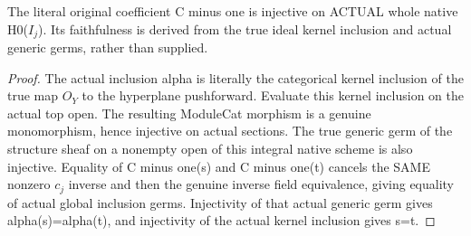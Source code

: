 \begin{lemma}
\label{lem:seven-native-negative-global-coefficient-faithful}
\leanok
The literal original coefficient C minus one is injective on ACTUAL
whole native H0($I_j$). Its faithfulness is derived from the true ideal
kernel inclusion and actual generic germs, rather than supplied.
\end{lemma}
\begin{proof}
The actual inclusion alpha is literally the categorical kernel inclusion
of the true map $O_Y$ to the hyperplane pushforward. Evaluate this kernel
inclusion on the actual top open. The resulting ModuleCat morphism is
a genuine monomorphism, hence injective on actual sections. The true
generic germ of the structure sheaf on a nonempty open of this integral
native scheme is also injective. Equality of C minus one(s) and C minus
one(t) cancels the SAME nonzero $c_j$ inverse and then the genuine inverse
field equivalence, giving equality of actual global inclusion germs.
Injectivity of that actual generic germ gives alpha(s)=alpha(t), and
injectivity of the actual kernel inclusion gives s=t.
\end{proof}

